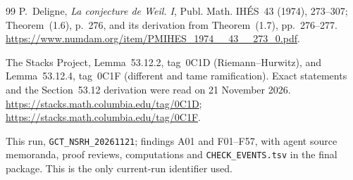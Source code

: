 \documentclass[11pt,a4paper]{article}
\theoremstyle{named}\newtheorem{finding}{Finding}[section]
\theoremstyle{definition}\newtheorem{definition}[finding]{Definition}
\theoremstyle{remark}\newtheorem{remark}[finding]{Remark}
\begin{document}
\begin{thebibliography}{99}
 P.~Deligne, \emph{La conjecture de Weil. I},
Publ. Math. IH\'ES~43 (1974), 273--307; Theorem~(1.6), p.~276,
and its derivation from Theorem~(1.7), pp.~276--277.
\url{https://www.numdam.org/item/PMIHES_1974__43__273_0.pdf}.

 The Stacks Project, Lemma~53.12.2, tag~0C1D (Riemann--Hurwitz), and Lemma~53.12.4, tag~0C1F (different and tame ramification). Exact statements and the Section~53.12 derivation were read on 21 November 2026. \url{https://stacks.math.columbia.edu/tag/0C1D}; \url{https://stacks.math.columbia.edu/tag/0C1F}.

 This run, \texttt{GCT\_NSRH\_20261121}; findings A01 and F01--F57, with agent source memoranda, proof reviews, computations and \texttt{CHECK\_EVENTS.tsv} in the final package. This is the only current-run identifier used.
\end{thebibliography}
\end{document}
